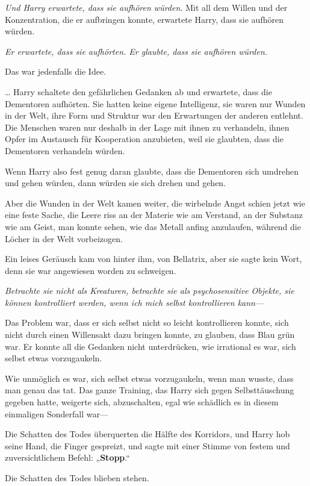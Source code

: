 {\emph{Und Harry erwartete, dass sie aufhören würden.} Mit all dem Willen und der Konzentration, die er aufbringen konnte, erwartete Harry, dass sie aufhören würden.

\emph{Er erwartete, dass sie aufhörten. Er glaubte, dass sie aufhören würden.}

Das war jedenfalls die Idee.

… Harry schaltete den gefährlichen Gedanken ab und erwartete, dass die Dementoren aufhörten. Sie hatten keine eigene Intelligenz, sie waren nur Wunden in der Welt, ihre Form und Struktur war den Erwartungen der anderen entlehnt. Die Menschen waren nur deshalb in der Lage mit ihnen zu verhandeln, ihnen Opfer im Austausch für Kooperation anzubieten, weil sie glaubten, dass die Dementoren verhandeln würden.

Wenn Harry also fest genug daran glaubte, dass die Dementoren sich umdrehen und gehen würden, dann würden sie sich drehen und gehen.

Aber die Wunden in der Welt kamen weiter, die wirbelnde Angst schien jetzt wie eine feste Sache, die Leere riss an der Materie wie am Verstand, an der Substanz wie am Geist, man konnte sehen, wie das Metall anfing anzulaufen, während die Löcher in der Welt vorbeizogen.

Ein leises Geräusch kam von hinter ihm, von Bellatrix, aber sie sagte kein Wort, denn sie war angewiesen worden zu schweigen.

\emph{Betrachte sie nicht als Kreaturen, betrachte sie als psychosensitive Objekte, sie können kontrolliert werden, wenn ich mich selbst kontrollieren kann}—

Das Problem war, dass er sich selbst nicht so leicht kontrollieren konnte, sich nicht durch einen Willensakt dazu bringen konnte, zu glauben, dass Blau grün war. Er konnte all die Gedanken nicht unterdrücken, wie irrational es war, sich selbst etwas vorzugaukeln.

Wie unmöglich es war, sich selbst etwas vorzugaukeln, wenn man wusste, dass man genau das tat. Das ganze Training, das Harry sich gegen Selbsttäuschung gegeben hatte, weigerte sich, abzuschalten, egal wie schädlich es in diesem einmaligen Sonderfall war—

Die Schatten des Todes überquerten die Hälfte des Korridors, und Harry hob seine Hand, die Finger gespreizt, und sagte mit einer Stimme von festem und zuversichtlichem Befehl: „\textbf{Stopp}.“

Die Schatten des Todes blieben stehen.

}
